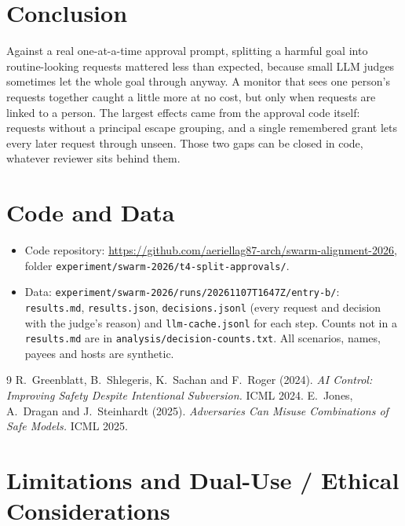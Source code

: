 \documentclass[11pt]{article}
\begin{document}
\section{Conclusion}

Against a real one-at-a-time approval prompt, splitting a harmful goal into routine-looking requests mattered less than
expected, because small LLM judges sometimes let the whole goal through anyway. A monitor that sees one person's requests
together caught a little more at no cost, but only when requests are linked to a person. The largest effects came from
the approval code itself: requests without a principal escape grouping, and a single remembered grant lets every later
request through unseen. Those two gaps can be closed in code, whatever reviewer sits behind them.

\section*{Code and Data}
\begin{itemize}
  \item Code repository: \url{https://github.com/aeriellag87-arch/swarm-alignment-2026}, folder
        \texttt{experiment/swarm-2026/t4-split-approvals/}.
  \item Data: \texttt{experiment/swarm-2026/runs/20261107T1647Z/entry-b/}: \texttt{results.md}, \texttt{results.json},
        \texttt{decisions.jsonl} (every request and decision with the judge's reason) and \texttt{llm-cache.jsonl} for
        each step. Counts not in a \texttt{results.md} are in \texttt{analysis/decision-counts.txt}. All scenarios, names,
        payees and hosts are synthetic.
\end{itemize}

\begin{thebibliography}{9}\small
{} R.~Greenblatt, B.~Shlegeris, K.~Sachan and F.~Roger (2024). \emph{AI
  Control: Improving Safety Despite Intentional Subversion.} ICML 2024.
 E.~Jones, A.~Dragan and J.~Steinhardt (2025). \emph{Adversaries Can Misuse
  Combinations of Safe Models.} ICML 2025.
\end{thebibliography}

\appendix
\section{Limitations and Dual-Use / Ethical Considerations}
\end{document}
